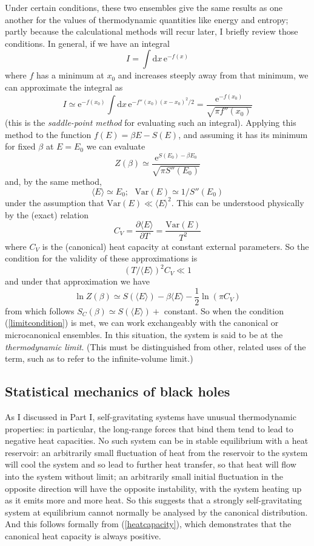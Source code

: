 \documentclass{article}
\newcommand{\dr}[1]{\ensuremath{\mathrm{d} #1\,}}
\newcommand{\pbp}[2]{\ensuremath{\frac{\partial #1}{\partial #2}}}
\newcommand{\be}{\begin{equation}}
\newcommand{\ee}{\end{equation}}
\newcommand{\e}[1]{\mathrm{e}^{#1}}
\begin{document}
Under certain conditions, these two ensembles give the same results as one another for the values of thermodynamic quantities like energy and entropy; partly because the calculational methods will recur later, I briefly review those conditions. In general, if we have an integral
\be
I = \int \dr{x} \e{-f(x)}
\ee
where $f$ has a minimum at $x_0$ and increases steeply away from that minimum, we can approximate the integral as
\be
I \simeq \e{-f(x_0)}\int \dr{x}\e{-f''(x_0)(x-x_0)^2/2} = \frac{\e{-f(x_0)}}{\sqrt{\pi f''(x_0)}}
\ee
(this is the \emph{saddle-point method} for evaluating such an integral). Applying this method to the function $f(E)=\beta E- S(E)$, and assuming it has its minimum for fixed $\beta$ at $E=E_0$ we can evaluate
\be
Z(\beta) \simeq \frac{\e{S(E_0)-\beta E_0}}{\sqrt{\pi S''(E_0)}}
\ee
and, by the same method,
\be
\langle E \rangle \simeq E_0;\,\,\,\, \mbox{Var}(E) \simeq 1/S''(E_0)
\ee
under the assumption that 
$ \mbox{Var}(E)\ll \langle E \rangle ^2.$ This can be understood physically by the (exact) relation
\be \label{heatcapacity}
C_V = \pbp{\langle E \rangle}{T} = \frac{\mbox{Var}(E)}{T^2}
\ee
where $C_V$ is the (canonical) heat capacity at constant external parameters. So the condition for the validity of these approximations is 
\be
\label{limitcondition} (T/\langle E \rangle)^2 C_V \ll 1
\ee
 and under that approximation we have
\be
\ln Z(\beta) \simeq S(\langle E \rangle) - \beta \langle E \rangle - \frac{1}{2}\ln (\pi C_V)
\ee
from which follows $S_C(\beta) \simeq S(\langle E \rangle)+$ constant. So when the condition (\ref{limitcondition}) is met, we can work exchangeably with the canonical or microcanonical ensembles. In this situation, the system is said to be at the \emph{thermodynamic limit}. (This must be distinguished from other, related uses of the term, such as to refer to the infinite-volume limit.)





\subsection{Statistical mechanics of black holes}

As I discussed in Part I, self-gravitating systems have unusual thermodynamic properties: in particular, the long-range forces that bind them tend to lead to negative heat capacities. No such system can be in stable equilibrium with a heat reservoir: an arbitrarily small fluctuation of heat from the reservoir to the system will cool the system and so lead to further heat transfer, so that heat will flow into the system without limit; an arbitrarily small initial fluctuation in the opposite direction will have the opposite instability, with the system heating up as it emits more and more heat. So this suggests that a strongly self-gravitating system at equilibrium cannot normally be analysed by the canonical distribution. And this follows formally from (\ref{heatcapacity}), which demonstrates that the canonical heat capacity is always positive.
\end{document}
